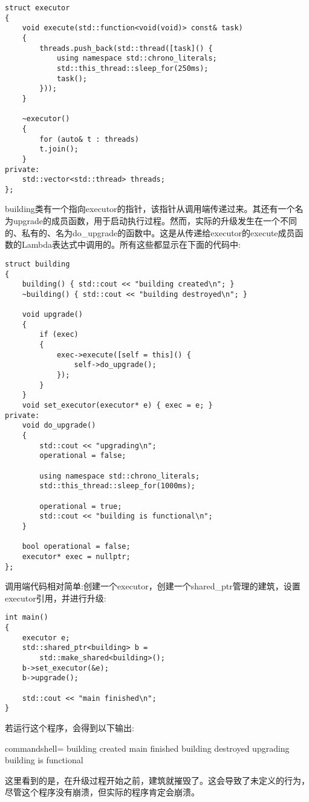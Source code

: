 \begin{lstlisting}[style=styleCXX]
struct executor
{
	void execute(std::function<void(void)> const& task)
	{
		threads.push_back(std::thread([task]() {
			using namespace std::chrono_literals;
			std::this_thread::sleep_for(250ms);
			task();
		}));
	}

	~executor()
	{
		for (auto& t : threads)
		t.join();
	}
private:
	std::vector<std::thread> threads;
};
\end{lstlisting}

building类有一个指向executor的指针，该指针从调用端传递过来。其还有一个名为upgrade的成员函数，用于启动执行过程。然而，实际的升级发生在一个不同的、私有的、名为do\_upgrade的函数中。这是从传递给executor的execute成员函数的Lambda表达式中调用的。所有这些都显示在下面的代码中:

\begin{lstlisting}[style=styleCXX]
struct building
{
	building() { std::cout << "building created\n"; }
	~building() { std::cout << "building destroyed\n"; }
	
	void upgrade()
	{
		if (exec)
		{
			exec->execute([self = this]() {
				self->do_upgrade();
			});
		}
	}
	void set_executor(executor* e) { exec = e; }
private:
	void do_upgrade()
	{
		std::cout << "upgrading\n";
		operational = false;
		
		using namespace std::chrono_literals;
		std::this_thread::sleep_for(1000ms);
		
		operational = true;
		std::cout << "building is functional\n";
	}

	bool operational = false;
	executor* exec = nullptr;
};
\end{lstlisting}

调用端代码相对简单:创建一个executor，创建一个shared\_ptr管理的建筑，设置executor引用，并进行升级:

\begin{lstlisting}[style=styleCXX]
int main()
{
	executor e;
	std::shared_ptr<building> b =
		std::make_shared<building>();
	b->set_executor(&e);
	b->upgrade();
	
	std::cout << "main finished\n";
}
\end{lstlisting}

若运行这个程序，会得到以下输出:

\begin{tcblisting}{commandshell={}}
building created
main finished
building destroyed
upgrading
building is functional
\end{tcblisting}

这里看到的是，在升级过程开始之前，建筑就摧毁了。这会导致了未定义的行为，尽管这个程序没有崩溃，但实际的程序肯定会崩溃。


